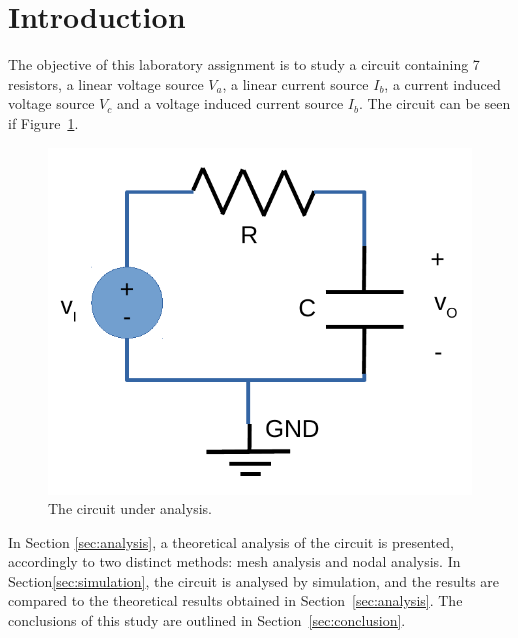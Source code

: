 \section{Introduction}
\label{sec:introduction}

The objective of this laboratory assignment is to study a circuit containing 7 resistors, a linear voltage source $V_a$, a linear current source $I_b$, a current induced voltage source $V_c$ and a voltage induced current source $I_b$. The circuit can be seen if Figure~\ref{fig:rc}.

\begin{figure}[h] \centering
\includegraphics[width=0.6\linewidth]{rc.pdf}
\caption{The circuit under analysis.}
\label{fig:rc}
\end{figure}\label{fig:rc}

In Section \ref{sec:analysis}, a theoretical analysis of the circuit is
presented, accordingly to two distinct methods: mesh analysis and nodal analysis. In Section\ref{sec:simulation}, the circuit is analysed by
simulation, and the results are compared to the theoretical results obtained in
Section~\ref{sec:analysis}. The conclusions of this study are outlined in
Section~\ref{sec:conclusion}.






